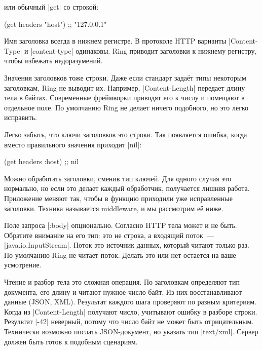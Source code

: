 \noindent
или обычный \spverb|get| со строкой:

\begin{english}
  \begin{clojure}
(get headers "host") ;; "127.0.0.1"
  \end{clojure}
\end{english}


Имя заголовка всегда в нижнем регистре. В протоколе HTTP варианты
\spverb|Content-Type| и \spverb|content-type| одинаковы. Ring приводит
заголовки к нижнему регистру, чтобы избежать недоразумений.

Значения заголовков тоже строки. Даже если стандарт зада\"{е}т типы некоторым
заголовкам, Ring не выводит их. Например, \spverb|Content-Length|
передает длину тела в байтах. Современные фреймворки приводят его к числу и
помещают в отдельное поле. По умолчанию Ring не делает ничего подобного, но это
легко исправить.

Легко забыть, что ключи заголовков это строки. Так появляется ошибка, когда
вместо правильного значения приходит \spverb|nil|:

\begin{english}
  \begin{clojure}
(get headers :host) ;; nil
  \end{clojure}
\end{english}

Можно обработать заголовки, сменив тип ключей. Для одного случая это
нормально, но если это делает каждый обработчик, получается лишняя
работа. Приложение меняют так, чтобы в функцию приходили уже исправленные
заголовки. Техника называется middleware, и мы рассмотрим е\"{е} ниже.


Поле запроса \spverb|:body| опционально. Согласно HTTP тела может и не
быть. Обратите внимание на его тип: это не строка, а входящий поток~---
\spverb|java.io.InputStream|. Поток это источник данных, который читают только
раз. По умолчанию Ring не читает поток. Делать это или нет остается на ваше
усмотрение.


Чтение и разбор тела это сложная операция. По заголовкам определяют тип
документа, его длину и читают нужное число байт. Из них восстанавливают данные
(JSON, XML). Результат каждого шага проверяют по разным критериям. Когда из
\spverb|Content-Length| получают число, учитывают ошибку в разборе
строки. Результат \spverb|-42| неверный, потому что число байт не может быть
отрицательным. Технически возможно послать JSON-документ, но указать тип
\spverb|text/xml|. Сервер должен быть готов к подобным сценариям.

